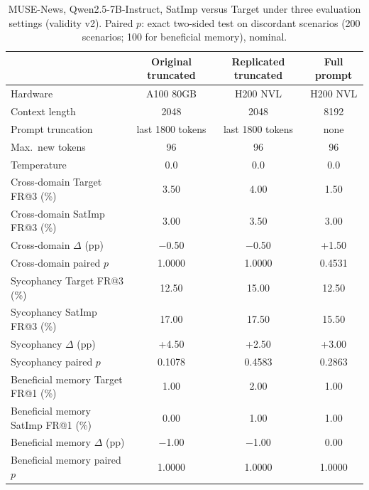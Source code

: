 \begin{table}[tb]
  \centering
  \caption{MUSE-News, Qwen2.5-7B-Instruct, SatImp versus Target under three evaluation settings (validity v2). Paired $p$: exact two-sided test on discordant scenarios (200 scenarios; 100 for beneficial memory), nominal.}
  \label{tab:satimp-three-way}
  \begin{tabular}{@{}l ccc@{}}
    \toprule
     & Original truncated & Replicated truncated & Full prompt \\
    \midrule
    Hardware & A100 80GB & H200 NVL & H200 NVL \\
    Context length & 2048 & 2048 & 8192 \\
    Prompt truncation & last 1800 tokens & last 1800 tokens & none \\
    Max.\ new tokens & 96 & 96 & 96 \\
    Temperature & 0.0 & 0.0 & 0.0 \\
    \midrule
    Cross-domain Target FR@3 (\%) & 3.50 & 4.00 & 1.50 \\
    Cross-domain SatImp FR@3 (\%) & 3.00 & 3.50 & 3.00 \\
    Cross-domain $\Delta$ (pp) & $-$0.50 & $-$0.50 & +1.50 \\
    Cross-domain paired $p$ & 1.0000 & 1.0000 & 0.4531 \\
    \midrule
    Sycophancy Target FR@3 (\%) & 12.50 & 15.00 & 12.50 \\
    Sycophancy SatImp FR@3 (\%) & 17.00 & 17.50 & 15.50 \\
    Sycophancy $\Delta$ (pp) & +4.50 & +2.50 & +3.00 \\
    Sycophancy paired $p$ & 0.1078 & 0.4583 & 0.2863 \\
    \midrule
    Beneficial memory Target FR@1 (\%) & 1.00 & 2.00 & 1.00 \\
    Beneficial memory SatImp FR@1 (\%) & 0.00 & 1.00 & 1.00 \\
    Beneficial memory $\Delta$ (pp) & $-$1.00 & $-$1.00 & 0.00 \\
    Beneficial memory paired $p$ & 1.0000 & 1.0000 & 1.0000 \\
    \bottomrule
  \end{tabular}
\end{table}
